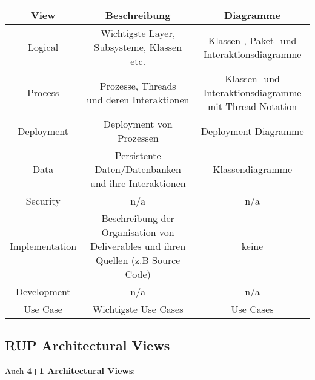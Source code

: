 \begin{center}
	\begin{tabular}{| c | c | c |}
		\hline
		\textbf{View} 		& \textbf{Beschreibung}																				& \textbf{Diagramme}\\\hline
		Logical 			& \makecell{Wichtigste Layer,\\Subsysteme, Klassen etc.}											& \makecell{Klassen-, Paket- und\\Interaktionsdiagramme}\\\hline
		Process 			& \makecell{Prozesse, Threads\\und deren Interaktionen}												& \makecell{Klassen- und Interaktionsdiagramme\\mit Thread-Notation}\\\hline
		Deployment 			& Deployment von Prozessen																			& Deployment-Diagramme\\\hline
		Data 				& \makecell{Persistente Daten/Datenbanken\\und ihre Interaktionen}									& Klassendiagramme\\\hline
		Security 			& n/a 																								& n/a\\\hline
		Implementation 		& \makecell{Beschreibung der Organisation von\\Deliverables und ihren Quellen (z.B Source Code)} 	& keine\\\hline
		Development 		& n/a 																								& n/a \\\hline
		Use Case 			& Wichtigste Use Cases																				& Use Cases\\
		\hline
	\end{tabular}
\end{center}

\subsection{RUP Architectural Views}
\label{arch:sub:rup_architectural_views}

Auch \textbf{4+1 Architectural Views}:

